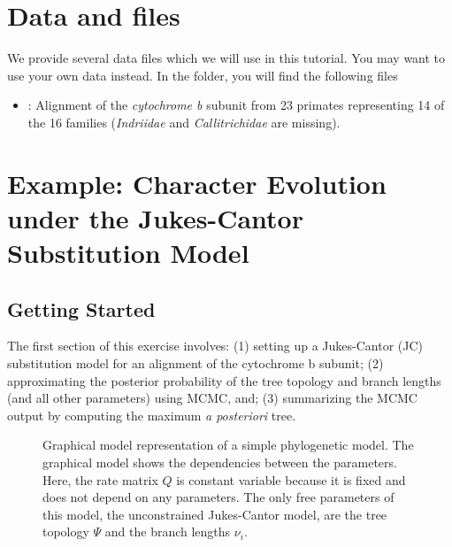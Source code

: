 \section{Data and files}

We provide several data files which we will use in this tutorial.
You may want to use your own data instead.
In the  folder, you will find the following files
\begin{itemize}
\item
{}: Alignment of the \textit{cytochrome b} subunit from 23 primates representing 14 of the 16 families (\textit{Indriidae} and \textit{Callitrichidae} are missing).
\end{itemize}


%
%
\newpage
\FloatBarrier
\section{Example: Character Evolution under the Jukes-Cantor Substitution Model}

\bigskip
\subsection{Getting Started}

The first section of this exercise involves:
(1) setting up a Jukes-Cantor (JC) substitution model for an alignment of the cytochrome b subunit;
(2) approximating the posterior probability of the tree topology and branch lengths (and all other parameters) using MCMC, and; 
(3) summarizing the MCMC output by computing the maximum \textit{a posteriori} tree. 

\begin{figure}[h!]
\centering
{}
\caption{\small Graphical model representation of a simple phylogenetic model. 
The graphical model shows the dependencies between the parameters.
Here, the rate matrix $Q$ is constant variable because it is fixed and does not depend on any parameters.
The only free parameters of this model, the unconstrained Jukes-Cantor model, are the tree topology $\Psi$ and the branch lengths $\nu_i$.}
\label{fig:jc}
\end{figure}

